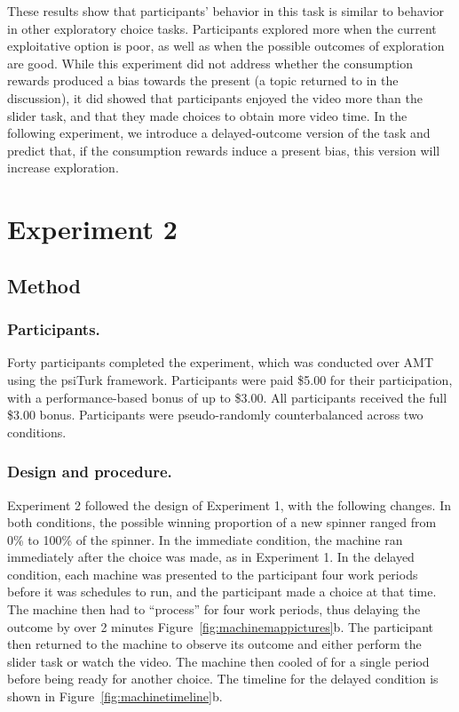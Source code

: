 \documentclass[10pt,letterpaper]{article}
\begin{document}
These results show that participants' behavior in this task is
similar to behavior in other exploratory choice tasks. Participants explored more
when the current exploitative option is poor, as well as when the possible
outcomes of exploration are good. While this experiment did not address whether the
consumption rewards produced a bias towards the present (a topic returned to in the
discussion), it did showed that participants enjoyed the video more than the slider
task, and that they made choices to obtain more video time. In the following
experiment, we introduce a delayed-outcome version of the task and predict that, if the
consumption rewards induce a present bias, this version will increase exploration.

\section{Experiment 2}

\subsection{Method}

\subsubsection{Participants.}

Forty participants completed the experiment, which was conducted over
AMT using the psiTurk framework.
Participants were paid \$5.00 for their participation, with a performance-based
bonus of up to \$3.00. All participants received the full \$3.00 bonus.
Participants were pseudo-randomly counterbalanced across two conditions.

\subsubsection{Design and procedure.}

Experiment 2 followed the design of Experiment 1, with the following changes. In
both conditions, the possible winning proportion of a new spinner ranged from 0\% to 100\% of
the spinner. In the immediate condition, the machine ran immediately after the
choice was made, as in Experiment 1. In the delayed condition, each machine was
presented to the participant four work periods before it was schedules to run,
and the participant made a choice at that time. The machine then had to
``process'' for four work periods, thus delaying
the outcome by over 2 minutes Figure~\ref{fig:machinemappictures}b. The participant then returned to the
machine to observe its outcome and either perform the slider task or
watch the video. The machine then cooled of for a single period before being
ready for another choice. The timeline for the delayed condition is shown in
Figure~\ref{fig:machinetimeline}b.
\end{document}
